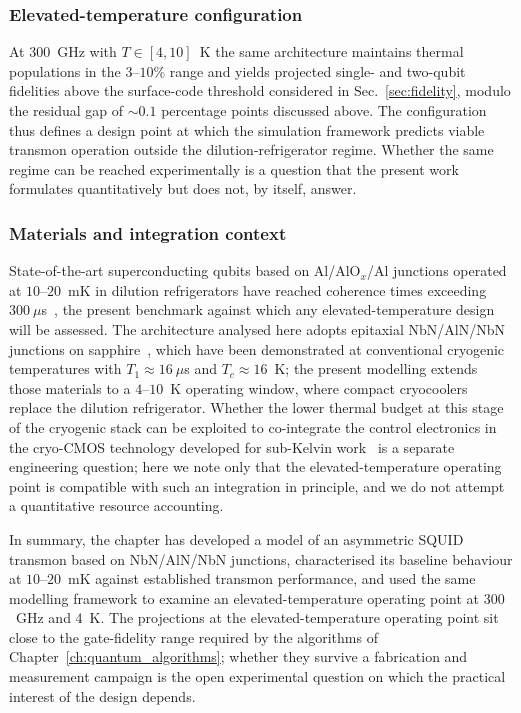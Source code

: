 \subsubsection*{Elevated-temperature configuration}

At $300$~GHz with $T \in [4,10]$~K the same architecture maintains thermal populations in the $3$--$10\%$ range and yields projected single- and two-qubit fidelities above the surface-code threshold considered in Sec.~\ref{sec:fidelity}, modulo the residual gap of $\sim 0.1$ percentage points discussed above. The configuration thus defines a design point at which the simulation framework predicts viable transmon operation outside the dilution-refrigerator regime. Whether the same regime can be reached experimentally is a question that the present work formulates quantitatively but does not, by itself, answer.

\subsubsection*{Materials and integration context}

State-of-the-art superconducting qubits based on Al/AlO$_x$/Al junctions operated at $10$--$20$~mK in dilution refrigerators have reached coherence times exceeding $300~\mu$s~\cite{krantz2019, place2021}, the present benchmark against which any elevated-temperature design will be assessed. The architecture analysed here adopts epitaxial NbN/AlN/NbN junctions on sapphire~\cite{nakamura2011epitaxialNbN, kim2021}, which have been demonstrated at conventional cryogenic temperatures with $T_1 \approx 16~\mu$s and $T_c \approx 16$~K; the present modelling extends those materials to a $4$--$10$~K operating window, where compact cryocoolers replace the dilution refrigerator. Whether the lower thermal budget at this stage of the cryogenic stack can be exploited to co-integrate the control electronics in the cryo-CMOS technology developed for sub-Kelvin work~\cite{Acharya2022, VanWinckel2022, Underwood2024} is a separate engineering question; here we note only that the elevated-temperature operating point is compatible with such an integration in principle, and we do not attempt a quantitative resource accounting.

In summary, the chapter has developed a model of an asymmetric SQUID transmon based on NbN/AlN/NbN junctions, characterised its baseline behaviour at $10$--$20$~mK against established transmon performance, and used the same modelling framework to examine an elevated-temperature operating point at $300$~GHz and $4$~K. The projections at the elevated-temperature operating point sit close to the gate-fidelity range required by the algorithms of Chapter~\ref{ch:quantum_algorithms}; whether they survive a fabrication and measurement campaign is the open experimental question on which the practical interest of the design depends.

